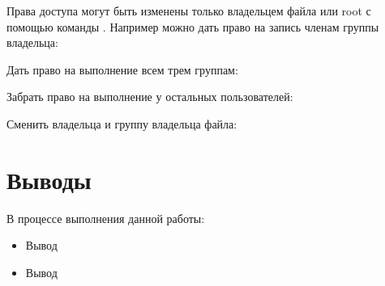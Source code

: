 Права доступа могут быть изменены только владельцем файла или root с помощью команды . Например можно дать право на запись членам группы владельца:


Дать право на выполнение всем трем группам:


Забрать право на выполнение у остальных пользователей:


Сменить владельца и группу владельца файла:


\section{Выводы}

В процессе выполнения данной работы:
\begin{itemize}
	\item Вывод
	\item Вывод
\end{itemize}



